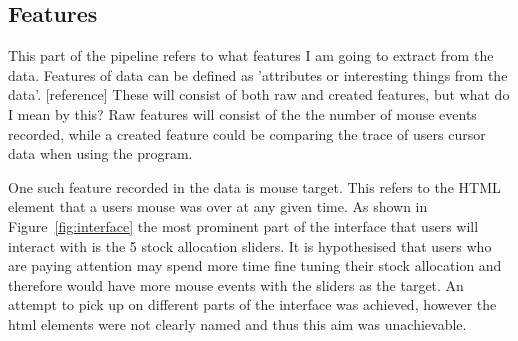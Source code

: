 \documentclass{article}
\begin{document}

\subsection{Features}




This part of the pipeline refers to what features I am going to extract from the data.
Features of data can be defined as 'attributes or interesting things from the data'. [reference]
These will consist of both raw and created features, but what do I mean by this?
Raw features will consist of the the number of mouse events recorded, while a created feature could be comparing the trace of users cursor data when using the program.

One such feature recorded in the data is mouse target.
This refers to the HTML element that a users mouse was over at any given time.
As shown in Figure~\ref{fig:interface} the most prominent part of the interface that users will interact with is the 5 stock allocation sliders.
It is hypothesised that users who are paying attention may spend more time fine tuning their stock allocation and therefore would have more mouse events with the sliders as the target.
An attempt to pick up on different parts of the interface was achieved, however the html elements were not clearly named and thus this aim was unachievable.
\end{document}
